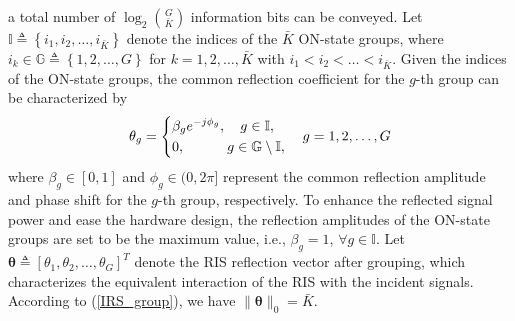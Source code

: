 \documentclass[draftclsnofoot,onecolumn,12pt]{IEEEtran}
\newtheorem{remark}{Remark}
\begin{document}
a total number of $\log_2 {G\choose{\bar K}}$ information bits can be conveyed. 
Let $\mathbb{I}\triangleq\left\{{i_1},{i_2},\ldots,{i_{\bar K}}\right\}$ denote the indices of the $\bar{K}$ ON-state groups, 
where $i_k \in \mathbb{G}\triangleq \left\{1,2,\ldots, { G}\right\}$ for $k=1,2,\ldots,{\bar K}$ with $i_1< i_2<\ldots<i_{\bar K}$. 
Given the indices of the ON-state groups, the common reflection coefficient for the $g$-th group can be characterized by
\begin{align}\label{IRS_group}
\theta_g=\left\{ \begin{gathered}
  \beta_g  e^{-j\phi_g},\quad g \in \mathbb{I}, \hfill \\
0 ,\quad\quad\quad g  \in \mathbb{G}\setminus \mathbb{I}, \hfill
\end{gathered}  \right.\quad g=1,2,\ldots,{G}
\end{align}
where $\beta_g \in [0,1]$ and $\phi_g\in(0, 2\pi]$ represent the common reflection amplitude and phase shift for the $g$-th group, respectively. 
To enhance the reflected signal power and ease the hardware design, the reflection amplitudes of the ON-state groups are set to be the maximum value, i.e., $\beta_g=1$, $\forall g\in\mathbb{I}$. 
Let ${\bm \theta}\triangleq \left[{ \theta}_1, { \theta}_2,\ldots, { \theta}_G   \right]^T$ denote the RIS reflection vector after grouping, which characterizes the equivalent interaction of the RIS with the incident signals. 
According to (\ref{IRS_group}), we have $\|{\bm \theta}\|_0={\bar K}$. 
\end{document}
